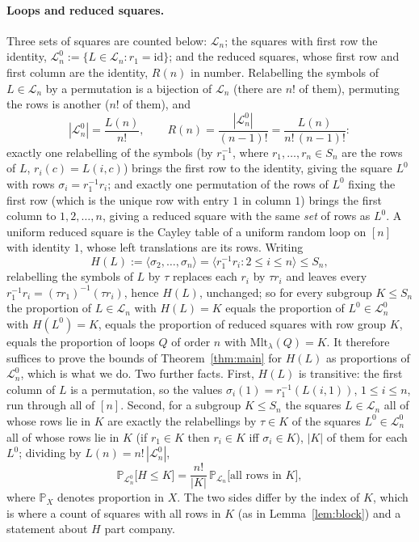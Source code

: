 \documentclass[11pt]{amsart}
\theoremstyle{plain}
\theoremstyle{remark}
\newcommand{\Mlt}{\mathrm{Mlt}}
\renewcommand{\Pr}{\mathbb{P}}
\newcommand{\LL}{\mathcal{L}}
\begin{document}
\paragraph{Loops and reduced squares.}  Three sets of squares are
counted below: $\LL_n$; the squares with first row the identity,
$\LL_n^0:=\{L\in\LL_n:r_1=\mathrm{id}\}$; and the reduced squares, whose
first row and first column are the identity, $R(n)$ in number.
Relabelling the symbols of $L\in\LL_n$ by a permutation is a bijection
of $\LL_n$ (there are $n!$ of them), permuting the rows is another
($n!$ of them), and
\begin{equation}\label{eq:R}
|\LL_n^0|=\frac{L(n)}{n!},\qquad R(n)=\frac{|\LL_n^0|}{(n-1)!}=\frac{L(n)}{n!\,(n-1)!}:
\end{equation}
exactly one relabelling of the symbols (by $r_1^{-1}$, where
$r_1,\dots,r_n\in S_n$ are the rows of $L$, $r_i(c)=L(i,c)$) brings the
first row to the identity, giving the square $L^0$ with rows
$\sigma_i=r_1^{-1}r_i$; and exactly one permutation of the rows of
$L^0$ fixing the first row (which is the unique row with entry $1$ in
column $1$) brings the first column to $1,2,\dots,n$, giving a reduced
square with the same \emph{set} of rows as $L^0$.  A uniform reduced
square is the Cayley table of a uniform random loop on $[n]$ with
identity $1$, whose left translations are its rows.  Writing
\[
H(L):=\langle\sigma_2,\dots,\sigma_n\rangle=\langle r_1^{-1}r_i:2\le i\le n\rangle\le S_n,
\]
relabelling the symbols of $L$ by $\tau$ replaces each $r_i$ by $\tau r_i$
and leaves every $r_1^{-1}r_i=(\tau r_1)^{-1}(\tau r_i)$, hence $H(L)$,
unchanged; so for every subgroup $K\le S_n$ the proportion of $L\in\LL_n$
with $H(L)=K$ equals the proportion of $L^0\in\LL_n^0$ with $H(L^0)=K$,
equals the proportion of reduced squares with row group $K$, equals the
proportion of loops $Q$ of order $n$ with $\Mlt_\lambda(Q)=K$.  It
therefore suffices to prove the bounds of Theorem~\ref{thm:main} for
$H(L)$ as proportions of $\LL_n^0$, which is what we do.  Two further
facts.  First, $H(L)$ is transitive: the first column of $L$ is a
permutation, so the values $\sigma_i(1)=r_1^{-1}(L(i,1))$, $1\le i\le n$,
run through all of $[n]$.  Second, for a subgroup $K\le S_n$ the squares
$L\in\LL_n$ all of whose rows lie in $K$ are exactly the relabellings by
$\tau\in K$ of the squares $L^0\in\LL_n^0$ all of whose rows lie in $K$
(if $r_1\in K$ then $r_i\in K$ iff $\sigma_i\in K$), $|K|$ of them for
each $L^0$; dividing by $L(n)=n!\,|\LL_n^0|$,
\begin{equation}\label{eq:K}
\Pr_{\LL_n^0}\bigl[H\le K\bigr]=\frac{n!}{|K|}\,\Pr_{\LL_n}\bigl[\text{all rows in }K\bigr],
\end{equation}
where $\Pr_X$ denotes proportion in $X$.  The two sides differ by the
index of $K$, which is where a count of squares with all rows in $K$
(as in Lemma~\ref{lem:block}) and a statement about $H$ part company.
\end{document}
